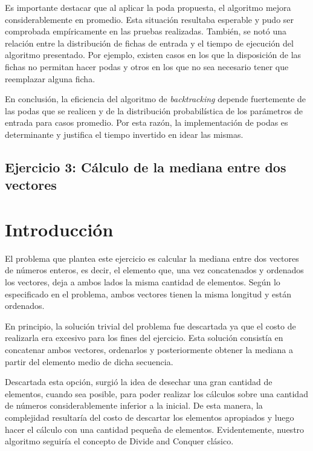 \documentclass[a4paper,10pt] {article}
\begin{document}
Es importante destacar que al aplicar la poda propuesta, el algoritmo mejora considerablemente en promedio. Esta situaci\'on resultaba esperable y pudo ser comprobada emp\'iricamente en las pruebas realizadas. Tambi\'en, se not\'o una relaci\'on entre la distribuci\'on de fichas de entrada y el tiempo de ejecuci\'on del algoritmo presentado. Por ejemplo, existen casos en los que la disposici\'on de las fichas no permitan hacer podas y otros en los que no sea necesario tener que reemplazar alguna ficha.

En conclusi\'on, la eficiencia del algoritmo de \textit{backtracking} depende fuertemente de las podas que se realicen y de la distribuci\'on probabil\'istica de los par\'ametros de entrada para casos promedio. Por esta raz\'on, la implementaci\'on de podas es determinante y justifica el tiempo invertido en idear las mismas.

\begin{center}
\section*{Ejercicio 3: C\'alculo de la mediana entre dos vectores}
\end{center}

\bigskip
\section*{Introducci\'on}

El problema que plantea este ejercicio es calcular la mediana entre dos vectores de n\'umeros enteros, es decir, el elemento que, una vez concatenados y ordenados los vectores, deja a ambos lados la misma cantidad de elementos. Seg\'un lo especificado en el problema, ambos vectores tienen la misma longitud y est\'an ordenados.

En principio, la soluci\'on trivial del problema fue descartada ya que el costo de realizarla era excesivo para los fines del ejercicio. Esta soluci\'on consist\'ia en concatenar ambos vectores, ordenarlos y posteriormente obtener la mediana a partir del elemento medio de dicha secuencia.

Descartada esta opci\'on, surgi\'o la idea de desechar una gran cantidad de elementos, cuando sea posible, para poder realizar los c\'alculos sobre una cantidad de n\'umeros considerablemente inferior a la inicial. De esta manera, la complejidad resultar\'ia del costo de descartar los elementos apropiados y luego hacer el c\'alculo con una cantidad peque\~{n}a de elementos. Evidentemente, nuestro algoritmo seguir\'ia el concepto de Divide and Conquer cl\'asico.
\end{document}
